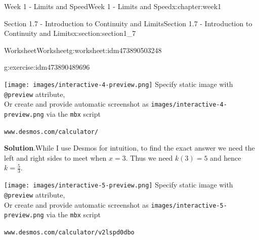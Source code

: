 \documentclass[oneside,10pt,]{book}
\newcommand{\blocktitlefont}{\relax}
\newcommand{\mono}[1]{\texttt{#1}}
\numberwithin{equation}{section}
\newlength{\qrsize}
\newlength{\previewwidth}
\begin{document}
\begin{chapterptx}{Week 1 - Limits and Speed}{}{Week 1 - Limits and Speed}{}{}{x:chapter:week1}
\begin{sectionptx}{Section 1.7 - Introduction to Continuity and Limits}{}{Section 1.7 - Introduction to Continuity and Limits}{}{}{x:section:section1_7}
\begin{worksheet-subsection}{Worksheet}{}{Worksheet}{}{}{g:worksheet:idm473890503248}
\begin{divisionexercise}{2}{}{}{g:exercise:idm473890489696}
\begin{tcbraster}[raster columns=2, raster column skip=1pt, raster halign=center, raster force size=false, raster left skip=0pt, raster right skip=0pt]%
\begin{tcolorbox}[previewstyle, width=\previewwidth]%
%
{\texttt{[image: images/interactive-4-preview.png]}}%
{\small{}Specify static image with \mono{@preview} attribute,\\Or create and provide automatic screenshot as \mono{images/interactive-4-preview.png} via the \mono{mbx} script}%
\end{tcolorbox}%
\begin{tcolorbox}[qrstyle]%
{\hypersetup{urlcolor=black}}%
\end{tcolorbox}%
\begin{tcolorbox}[captionstyle]%
\small \mono{www.desmos.com/calculator/}\end{tcolorbox}%
\end{tcbraster}%
%
\textbf{\blocktitlefont Solution}.\hypertarget{g:solution:idm473890485904}{}\quad{}While I use Desmos for intuition, to find the exact answer we need the left and right sides to meet when \(x=3\). Thus we need \(k(3)=5\) and hence \(k=\frac 53\).%
\par
\setlength{\qrsize}{9em}
\setlength{\previewwidth}{\linewidth}
\addtolength{\previewwidth}{-\qrsize}
\begin{tcbraster}[raster columns=2, raster column skip=1pt, raster halign=center, raster force size=false, raster left skip=0pt, raster right skip=0pt]%
\begin{tcolorbox}[previewstyle, width=\previewwidth]%
%
{\texttt{[image: images/interactive-5-preview.png]}}%
{\small{}Specify static image with \mono{@preview} attribute,\\Or create and provide automatic screenshot as \mono{images/interactive-5-preview.png} via the \mono{mbx} script}%
\end{tcolorbox}%
\begin{tcolorbox}[qrstyle]%
{\hypersetup{urlcolor=black}}%
\end{tcolorbox}%
\begin{tcolorbox}[captionstyle]%
\small \mono{www.desmos.com/calculator/v2lspd0dbo}\end{tcolorbox}%
\end{tcbraster}%
%
\end{divisionexercise}%

\end{worksheet-subsection}
\end{sectionptx}
\end{chapterptx}
\end{document}
